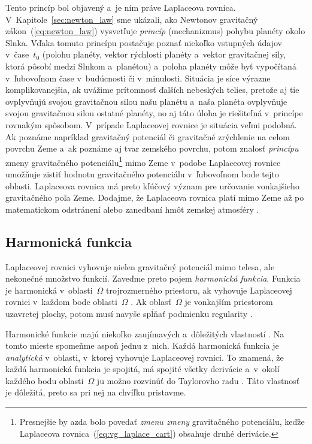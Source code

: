 \documentclass[a4paper, 12pt]{book}
\begin{document}
Tento princíp bol objavený a~je ním práve Laplaceova rovnica.  
V~Kapitole~\ref{sec:newton_law} sme ukázali, ako Newtonov gravitačný 
zákon~(\ref{eq:newton_law}) vysvetľuje \emph{princíp} (mechanizmus) pohybu 
planéty okolo Slnka.  Vďaka tomuto princípu postačuje poznať niekoľko vstupných 
údajov v~čase~$t_0$ (polohu planéty, vektor rýchlosti planéty a~vektor 
gravitačnej sily, ktorá pôsobí medzi Slnkom a~planétou) a~poloha planéty môže 
byť vypočítaná v~ľubovoľnom čase v~budúcnosti či v~minulosti.  Situácia je síce 
výrazne komplikovanejšia, ak uvážime prítomnosť ďalších nebeských telies, 
pretože aj tie ovplyvňujú svojou gravitačnou silou našu planétu a~naša planéta 
ovplyvňuje svojou gravitačnou silou ostatné planéty, no aj táto úloha je 
riešiteľná v~princípe rovnakým spôsobom.  V~prípade Laplaceovej rovnice je 
situácia veľmi podobná.  Ak poznáme napríklad gravitačný potenciál či 
gravitačné zrýchlenie na celom povrchu Zeme a~ak poznáme aj tvar zemského 
povrchu, potom znalosť \emph{princípu} zmeny gravitačného 
potenciálu\footnote{Presnejšie by azda bolo povedať \textit{zmenu zmeny} 
gravitačného potenciálu, keďže Laplaceova rovnica~(\ref{eq:vg_laplace_cart}) 
obsahuje druhé derivácie.} mimo Zeme v~podobe Laplaceovej rovnice umožňuje 
zistiť hodnotu gravitačného potenciálu v~ľubovoľnom bode tejto oblasti.  
Laplaceova rovnica má preto kľúčový význam pre určovanie vonkajšieho 
gravitačného poľa Zeme.  Dodajme, že Laplaceova rovnica platí mimo Zeme až po 
matematickom odstránení alebo zanedbaní hmôt zemskej atmosféry \parencite[pozri 
napríklad][]{Janak2006}.



\subsection{Harmonická funkcia}
\label{sec:harmonic_function}

Laplaceovej rovnici vyhovuje nielen gravitačný potenciál mimo telesa, ale
nekonečné množstvo funkcií.  Zaveďme preto pojem \emph{harmonická funkcia}.
Funkcia je harmonická v~oblasti~$\Omega$ trojrozmerného priestoru, ak vyhovuje 
Laplaceovej rovnici v~každom bode oblasti~$\Omega$ 
\parencite{MoritzPhysicalGeodesy}.  Ak oblasť~$\Omega$ je vonkajším priestorom 
uzavretej plochy, potom musí navyše spĺňať podmienku regularity 
\parencite[pozri vzťah~\ref{eq:regular_function};][]{MoritzPhysicalGeodesy}.

Harmonické funkcie majú niekoľko zaujímavých a~dôležitých vlastností 
\parencite[pozri napríklad][]{Pick1973,Kellogg1967,Janak2006}.  Na tomto mieste 
spomeňme aspoň jednu z~nich.  Každá harmonická funkcia je \emph{analytická} 
v~oblasti, v~ktorej vyhovuje Laplaceovej rovnici.  To znamená, že každá 
harmonická funkcia je spojitá, má spojité všetky derivácie a~v~okolí každého 
bodu oblasti~$\Omega$ ju možno rozvinúť do Taylorovho radu 
\parencite{MoritzPhysicalGeodesy}.  Táto vlastnosť je dôležitá, preto sa pri 
nej na chvíľku pristavme.
\end{document}
